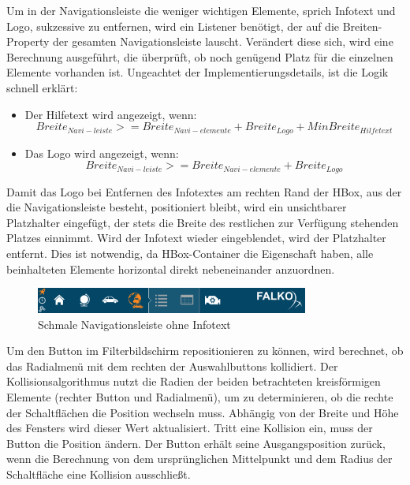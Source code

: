Um in der Navigationsleiste die weniger wichtigen Elemente, sprich Infotext und Logo, sukzessive zu entfernen, wird ein Listener benötigt, der auf die Breiten-Property der gesamten Navigationsleiste lauscht. Verändert diese sich, wird eine Berechnung ausgeführt, die überprüft, ob noch genügend Platz für die einzelnen Elemente vorhanden ist. Ungeachtet der Implementierungsdetails, ist die Logik schnell erklärt:
\begin{itemize}
	\item Der Hilfetext wird angezeigt, wenn:
 		\begin{equation}
 			Breite_{Navi-leiste} >= Breite_{Navi-elemente} + Breite_{Logo} + MinBreite_{Hilfetext}
 		\end{equation}
 	\item Das Logo wird angezeigt, wenn:
 		\begin{equation}
	 		Breite_{Navi-leiste} >= Breite_{Navi-elemente} + Breite_{Logo}
 		\end{equation}
\end{itemize}
Damit das Logo bei Entfernen des Infotextes am rechten Rand der HBox, aus der die Navigationsleiste besteht, positioniert bleibt, wird ein unsichtbarer Platzhalter eingefügt, der stets die Breite des restlichen zur Verfügung stehenden Platzes einnimmt. Wird der Infotext wieder eingeblendet, wird der Platzhalter entfernt. Dies ist notwendig, da HBox-Container die Eigenschaft haben, alle beinhalteten Elemente horizontal direkt nebeneinander anzuordnen.\par
\begin{figure}[H]
 \centering
 \includegraphics[width=0.8\textwidth]{grafiken/fix_nav.png}
 \caption{Schmale Navigationsleiste ohne Infotext}
 \label{fig:fixNav}
\end{figure}
Um den Button im Filterbildschirm repositionieren zu können, wird berechnet, ob das Radialmenü mit dem rechten der Auswahlbuttons kollidiert. Der Kollisionsalgorithmus nutzt die Radien der beiden betrachteten kreisförmigen Elemente (rechter Button und Radialmenü), um zu determinieren, ob die rechte der Schaltflächen die Position wechseln muss. Abhängig von der Breite und Höhe des Fensters wird dieser Wert aktualisiert. Tritt eine Kollision ein, muss der Button die Position ändern. Der Button erhält seine Ausgangsposition zurück, wenn die Berechnung von dem ursprünglichen Mittelpunkt und dem Radius der Schaltfläche eine Kollision ausschließt.\par
